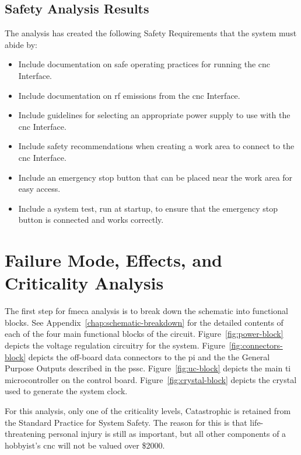 \subsection{Safety Analysis Results}
The analysis has created the following Safety Requirements that the system must abide by:
\begin{itemize}
	\item Include documentation on safe operating practices for running the \gls{cnc} Interface.
	\item Include documentation on \gls{rf} emissions from the \gls{cnc} Interface.
	\item Include guidelines for selecting an appropriate power supply to use with the \gls{cnc} Interface.
	\item Include safety recommendations when creating a work area to connect to the \gls{cnc} Interface.
	\item Include an emergency stop button that can be placed near the work area for easy access.
	\item Include a system test, run at startup, to ensure that the emergency stop button is connected and works correctly.
\end{itemize}

\section{Failure Mode, Effects, and Criticality Analysis}
The first step for \gls{fmeca} analysis is to break down the schematic into functional blocks. 
See Appendix~\ref{chap:schematic-breakdown} for the detailed contents of each of the four main functional blocks of the circuit.
Figure~\ref{fig:power-block} depicts the voltage regulation circuitry for the system.
Figure~\ref{fig:connectors-block} depicts the off-board data connectors to the \gls{pi} and the the General Purpose Outputs described in the \gls{pssc}.
Figure~\ref{fig:uc-block} depicts the main \gls{ti} microcontroller on the control board.
Figure~\ref{fig:crystal-block} depicts the crystal used to generate the system clock.

For this analysis, only one of the criticality levels, Catastrophic is retained from the Standard Practice for System Safety\cite{mil882d}.
The reason for this is that life-threatening personal injury is still as important, but all other components of a hobbyist's \gls{cnc} will not be valued over \$2000.

